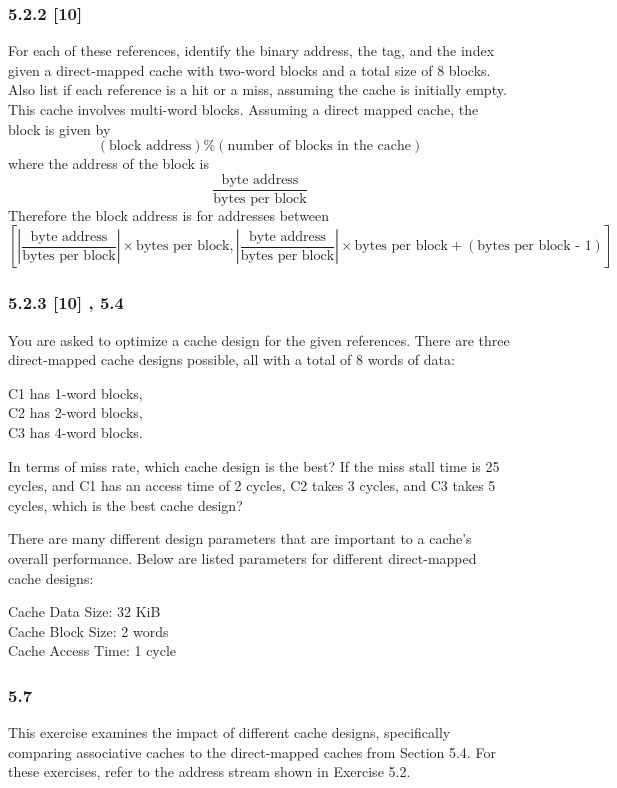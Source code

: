 \documentclass[fleqn]{article}
\begin{document}
\subsubsection*{5.2.2 [10] \textrangle} For each of these references, identify the binary address, the tag, and the index given a direct-mapped cache with two-word blocks and a total size of 8 blocks. Also list if each reference is a hit or a miss, assuming the cache is initially empty.
This cache involves multi-word blocks. Assuming a direct mapped cache, the block is given by
\[(\text{block address}) \% (\text{number of blocks in the cache})\] where the address of the block is
\[\frac{\text{byte address}}{\text{bytes per block}}\] 
Therefore the block address is for addresses between
\[
\left[ \left| \frac{\text{byte address}}{\text{bytes per block}} \right| \times \text{bytes per block},  \left| \frac{\text{byte address}}{\text{bytes per block}} \right| \times \text{bytes per block} + (\text{bytes per block - 1})\right]
\]

\subsubsection*{5.2.3 [10] , 5.4\textrangle} You are asked to optimize a cache design for the given references. There are three direct-mapped cache designs possible, all with a total of 8 words of data:

C1 has 1-word blocks,\\
C2 has 2-word blocks,\\
C3 has 4-word blocks.

In terms of miss rate, which cache design is the best? If the miss stall time is 25 cycles, and C1 has an access time of 2 cycles, C2 takes 3 cycles, and C3 takes 5 cycles, which is the best cache design?

There are many different design parameters that are important to a cache's overall performance. Below are listed parameters for different direct-mapped cache designs:

Cache Data Size: 32 KiB\\
Cache Block Size: 2 words\\
Cache Access Time: 1 cycle


\subsubsection*{5.7} This exercise examines the impact of different cache designs, specifically comparing associative caches to the direct-mapped caches from Section 5.4. For these exercises, refer to the address stream shown in Exercise 5.2.
\end{document}
